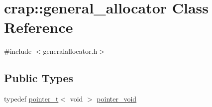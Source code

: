 \hypertarget{classcrap_1_1general__allocator}{}\section{crap\+:\+:general\+\_\+allocator Class Reference}
\label{classcrap_1_1general__allocator}


{\ttfamily \#include $<$generalallocator.\+h$>$}

\subsection*{Public Types}
\begin{DoxyCompactItemize}
\item 
typedef \hyperlink{structcrap_1_1pointer__t}{pointer\+\_\+t}$<$ void $>$ \hyperlink{classcrap_1_1general__allocator_adc45630f82d3467f4a968e412cac88fc}{pointer\+\_\+void}
\end{DoxyCompactItemize}
